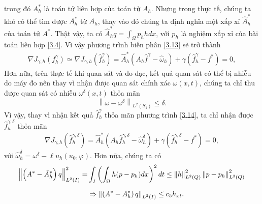 \documentclass[]{article}
\begin{document}
trong đó $A_h^*$ là toán tử liên hợp của toán tử $A_h$. Nhưng trong thực tế, chúng ta khó có thể tìm được $A^*_h$ từ $A_h$, thay vào đó chúng ta định nghĩa một xấp xỉ $\hat{A}_h^*$ của toán tử $A^*$. Thật vậy, ta có $\hat{A}^*_hq=\int_\Omega p_hhdx$, với $p_h$ là nghiệm xấp xỉ của bài toán liên hợp \eqref{3.4}. Vì vậy phương trình biến phân \eqref{3.13} sẽ trở thành
\begin{align}\label{3.14}
	\nabla J_{\gamma, h}(f^\gamma_h)\simeq\nabla J_{\gamma, h}(\hat{f}^\gamma_h)= \hat{A}_h^*(A_h\hat{f}^\gamma-\hat{\omega}_h)+\gamma(\hat{f}^\gamma_h-f^*)=0,
\end{align}
Hơn nữa, trên thực tế khi quan sát và đo đạc, kết quả quan sát có thể bị nhiễu do máy đo nên thay vì nhận được quan sát chính xác $\omega(x, t)$, chúng ta chỉ thu được quan sát có nhiễu $\omega^{\delta}(x, t)$ thỏa mãn
$$\left\| \omega-\omega^\delta\right\|_{L^2(S_1)}\leq \delta.$$
Vì vậy, thay vì nhận kết quả $\hat{f}^\gamma_h$ thỏa mãn phương trình \eqref{3.14}, ta chỉ nhận được $\hat{f}^{\gamma, \delta}_h$ thỏa mãn
\begin{align}\label{3.15}
	\nabla J_{\gamma, h}\left(\hat{f}^{\gamma, \delta}_h\right)= \hat{A}_h^*(A_h\hat{f}^{\gamma, \delta}_h-\hat{\omega}_h^\delta)+\gamma(\hat{f}^{\gamma, \delta}_h-f^*)=0,
\end{align}
với $\hat{\omega}_h^\delta=\omega^\delta-\ell u_h(u_0, \varphi)$.
Hơn nữa, chúng ta có
\begin{align}
	\left\| \left(A^*-\hat{A}^*_h\right)q\right\|_{L^2(I)}^2=&\int_I\left(\int_\Omega h(p-p_h)dx\right)^2dt\leq \left\| h\right\|_{L^2(Q)}^2\left\| p-p_h\right\|_{L^2(Q)}^2\notag\\[0.2cm]
	&\Rightarrow \left\| \left(A^*-A^*_h\right)q\right\|_{L^2(I)}\leq c_5h_{xt}.\label{3.16}
\end{align}
\end{document}
